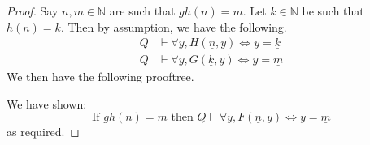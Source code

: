 \documentclass[12pt]{article}
\theoremstyle{plain}
\theoremstyle{definition}
\newcommand{\bb}[1]{\mathbb{#1}}
\newenvironment{scprooftree}[1]%
{\gdef\scalefactor{#1}\begin{center}\proofSkipAmount \leavevmode}%
	{\scalebox{\scalefactor}{\DisplayProof}\proofSkipAmount \end{center} }
\begin{document}
	\begin{proof}
		Say $n,m \in \bb{N}$ are such that $gh(n) = m$. Let $k \in \bb{N}$ be such that $h(n) = k$. Then by assumption, we have the following.
		\begin{align}
			Q &\vdash \forall y, H(\underline{n},y) \Longleftrightarrow y = \underline{k}\\
			Q &\vdash \forall y, G(\underline{k},y) \Longleftrightarrow y = \underline{m}\label{eq:second_comp}
		\end{align}
		We then have the following prooftree.
		\begin{center}
			\begin{scprooftree}{0.64}
			\end{scprooftree}
		\end{center}
	We have shown:
		\begin{equation}
			\text{If }gh(n) = m\text{ then }Q\vdash \forall y, F(\underline{n},y) \Longleftrightarrow y = \underline{m}
		\end{equation}
		as required.
	\end{proof}
\end{document}
